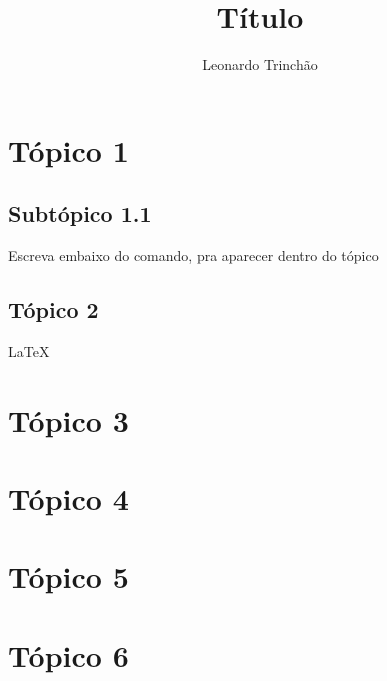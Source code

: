 \documentclass{article}
\begin{document}
\title{Título}
\author{Leonardo Trinchão}

\maketitle

\section{Tópico 1}
\subsection{Subtópico 1.1}

Escreva embaixo do comando, pra aparecer dentro do tópico

\subsection{Tópico 2}

{\LaTeX}

\section{Tópico 3}

\section{Tópico 4}

\section{Tópico 5}

\section{Tópico 6}
\end{document}
